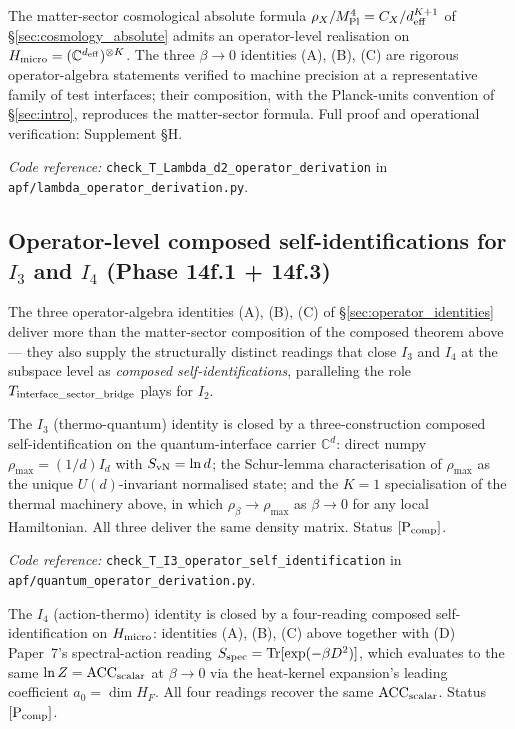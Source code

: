 \documentclass[11pt]{article}
\newcommand{\coderef}[2]{\smallskip\noindent\textit{Code reference:} \texttt{#1} in \texttt{#2}.}
\newcommand{\Mpl}{M_{\rm Pl}}
\begin{document}
\begin{tcolorbox}[apfbox, title={Theorem T\_Lambda\_d2\_operator\_derivation}]
The matter-sector cosmological absolute formula $\rho_X/\Mpl^4 = C_X/d_{\rm eff}^{K+1}$ of \S\ref{sec:cosmology_absolute} admits an operator-level realisation on $H_{\rm micro} = (\mathbb{C}^{d_{\rm eff}})^{\otimes K}$.  The three $\beta \to 0$ identities (A), (B), (C) are rigorous operator-algebra statements verified to machine precision at a representative family of test interfaces; their composition, with the Planck-units convention of \S\ref{sec:intro}, reproduces the matter-sector formula.  Full proof and operational verification: Supplement \S H.
\end{tcolorbox}

\coderef{check\_T\_Lambda\_d2\_operator\_derivation}{apf/lambda\_operator\_derivation.py}

\subsection{Operator-level composed self-identifications for $I_3$ and $I_4$ (Phase 14f.1 + 14f.3)}\label{sec:operator_composed_ik}

The three operator-algebra identities (A), (B), (C) of \S\ref{sec:operator_identities} deliver more than the matter-sector composition of the composed theorem above --- they also supply the structurally distinct readings that close $I_3$ and $I_4$ at the subspace level as \emph{composed self-identifications}, paralleling the role $T_{\rm interface\_sector\_bridge}$ plays for $I_2$.

\begin{tcolorbox}[apfbox, title={Theorem T\_I3\_operator\_self\_identification}]
The $I_3$ (thermo-quantum) identity is closed by a three-construction composed self-identification on the quantum-interface carrier $\mathbb{C}^d$: direct numpy $\rho_{\max} = (1/d) I_d$ with $S_{\rm vN} = \ln d$; the Schur-lemma characterisation of $\rho_{\max}$ as the unique $U(d)$-invariant normalised state; and the $K = 1$ specialisation of the thermal machinery above, in which $\rho_\beta \to \rho_{\max}$ as $\beta \to 0$ for any local Hamiltonian.  All three deliver the same density matrix.  Status $[\mathrm{P}_{\rm comp}]$.
\end{tcolorbox}

\coderef{check\_T\_I3\_operator\_self\_identification}{apf/quantum\_operator\_derivation.py}

\begin{tcolorbox}[apfbox, title={Theorem T\_I4\_operator\_self\_identification}]
The $I_4$ (action-thermo) identity is closed by a four-reading composed self-identification on $H_{\rm micro}$: identities (A), (B), (C) above together with (D) Paper~7's spectral-action reading $S_{\rm spec} = \mathrm{Tr}[\exp(-\beta D^2)]$, which evaluates to the same $\ln Z = \mathrm{ACC}_{\rm scalar}$ at $\beta \to 0$ via the heat-kernel expansion's leading coefficient $a_0 = \dim H_F$.  All four readings recover the same $\mathrm{ACC}_{\rm scalar}$.  Status $[\mathrm{P}_{\rm comp}]$.
\end{tcolorbox}
\end{document}
